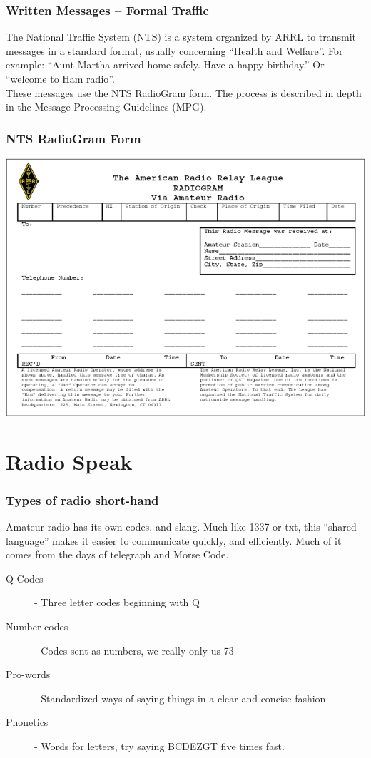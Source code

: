 \documentclass[10pt, handout]{beamer}
\begin{document}
\begin{frame}
\frametitle{Written Messages – Formal Traffic}
The National Traffic System (NTS) is a system organized by ARRL to transmit messages in a standard format, usually concerning “Health and Welfare”. For example: “Aunt Martha arrived home safely. Have a happy birthday.”  Or “welcome to Ham radio”. \\

These messages use the NTS RadioGram form. The process is described in depth in the Message Processing Guidelines (MPG).
\end{frame}

\begin{frame}
\frametitle{NTS RadioGram Form}
\centering \includegraphics[width=\textwidth]{radiogramform.png}
\end{frame}

\section{Radio Speak}

\begin{frame}
\frametitle{Types of radio short-hand}
Amateur radio has its own codes, and slang. Much like 1337 or txt, this ``shared language'' makes it easier to communicate quickly, and efficiently. Much of it comes from the days of telegraph and Morse Code.
\begin{description}
\item[Q Codes] - Three letter codes beginning with Q
\item[Number codes] - Codes sent as numbers, we really only us 73
\item[Pro-words] - Standardized ways of saying things in a clear and concise fashion
\item[Phonetics] - Words for letters, try saying BCDEZGT five times fast.
\end{description}
\end{frame}
\end{document}
